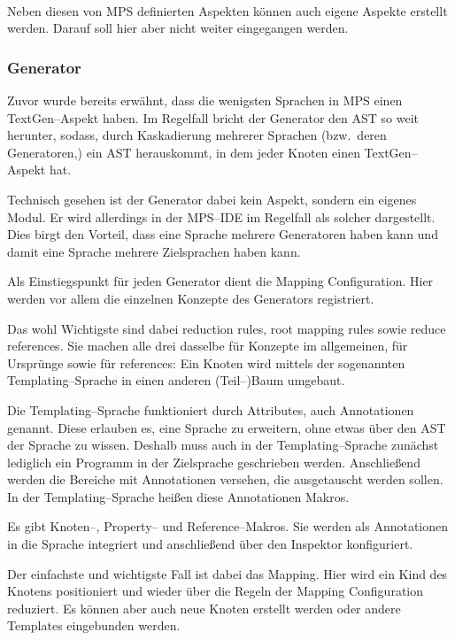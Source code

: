 \paragraph*{}
Neben diesen von \ac{MPS} definierten Aspekten können auch eigene Aspekte erstellt werden.
Darauf soll hier aber nicht weiter eingegangen werden.

\subsubsection{Generator}
Zuvor wurde bereits erwähnt, dass die wenigsten Sprachen in \ac{MPS} einen TextGen--Aspekt haben.
Im Regelfall bricht der Generator den \ac{AST} so weit herunter, sodass, durch Kaskadierung mehrerer Sprachen (bzw.\ deren Generatoren,) ein \ac{AST} herauskommt, in dem jeder Knoten einen TextGen--Aspekt hat.~\autocite{jetbrains-sro-no-dateX}

Technisch gesehen ist der Generator dabei kein Aspekt, sondern ein eigenes Modul.
Er wird allerdings in der \acs{MPS}--\acs{IDE} im Regelfall als solcher dargestellt.
Dies birgt den Vorteil, dass eine Sprache mehrere Generatoren haben kann und damit eine Sprache mehrere Zielsprachen haben kann.

Als Einstiegspunkt für jeden Generator dient die {\ttfamily Mapping Configuration}.
Hier werden vor allem die einzelnen Konzepte des Generators registriert.

Das wohl Wichtigste sind dabei {\ttfamily reduction rules}, {\ttfamily root mapping rules} sowie {\ttfamily reduce references}.
Sie machen alle drei dasselbe für Konzepte im allgemeinen, für Ursprünge sowie für {\ttfamily references}: Ein Knoten wird mittels der sogenannten Templating--Sprache in einen anderen (Teil--)Baum umgebaut.

Die Templating--Sprache funktioniert durch Attributes, auch Annotationen genannt.
Diese erlauben es, eine Sprache zu erweitern, ohne etwas über den \ac{AST} der Sprache zu wissen.
Deshalb muss auch in der Templating--Sprache zunächst lediglich ein Programm in der Zielsprache geschrieben werden.
Anschließend werden die Bereiche mit Annotationen versehen, die ausgetauscht werden sollen.
In der Templating--Sprache heißen diese Annotationen Makros.

Es gibt Knoten--, Property-- und Reference--Makros.
Sie werden als Annotationen in die Sprache integriert und anschließend über den Inspektor konfiguriert.

Der einfachste und wichtigste Fall ist dabei das Mapping.
Hier wird ein Kind des Knotens positioniert und wieder über die Regeln der {\ttfamily Mapping Configuration} reduziert.
Es können aber auch neue Knoten erstellt werden oder andere Templates eingebunden werden.

